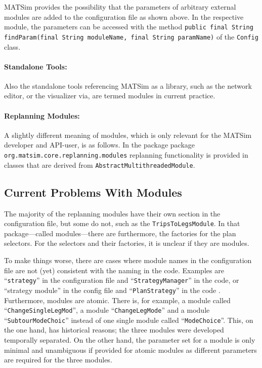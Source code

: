 MATSim provides the possibility that the parameters of arbitrary external modules are added to the configuration file as shown above. In the respective module, the parameters can be accessed with the method \lstinline|public final String findParam(final String moduleName, final String paramName)| of the \lstinline|Config| class.

\paragraph{Standalone Tools:} %
Also the standalone tools referencing MATSim as a library, such as the network editor, or the visualizer via, are termed modules in current practice.

\paragraph{Replanning Modules:} %
A slightly different meaning of modules, which is only relevant for the MATSim developer and API-user, is as follows. In the package package \lstinline|org.matsim.core.replanning.modules| replanning functionality is provided in classes that are derived from \lstinline|AbstractMultithreadedModule|.

\subsection{Current Problems With Modules}
The majority of the replanning modules have their own section in the configuration file, but some do not, such as the \lstinline|TripsToLegsModule|. In that package---called modules---there are furthermore, the factories for the plan selectors. For the selectors and their factories, it is unclear if they are modules.

To make things worse, there are cases where module names in the configuration file are not (yet) consistent with the naming in the code. Examples are ``\lstinline|strategy|'' in the configuration file and ``\lstinline|StrategyManager|'' in the code, or ``strategy module'' in the config file and ``\lstinline|PlanStrategy|'' in the code . Furthermore, modules are atomic. There is, for example, a module called ``\lstinline|ChangeSingleLegMod|'', a module ``\lstinline|ChangeLegMode|'' and a module ``\lstinline|SubtourModeChoic|'' instead of one single module called ``\lstinline|ModeChoice|''. This, on the one hand, has historical reasons; the three modules were developed temporally separated. On the other hand, the parameter set for a module is only minimal and unambiguous if provided for atomic modules as different parameters are required for the three modules.

